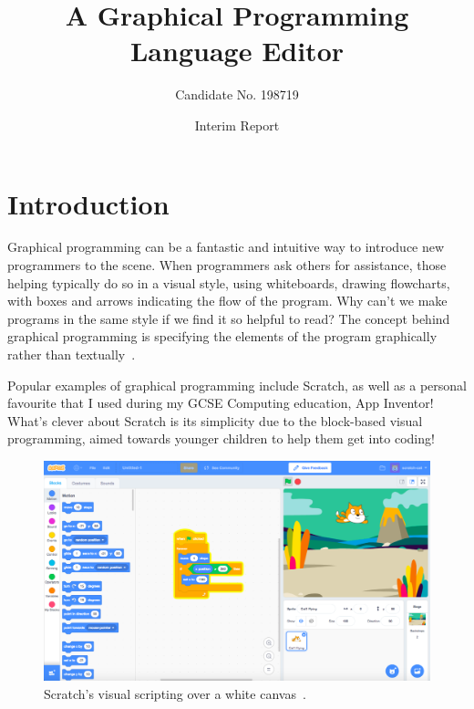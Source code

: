 \documentclass[a4paper, 12pt]{article}
\begin{document}
    \title{A Graphical Programming Language Editor}
    \author{Candidate No. 198719}
    \date{Interim Report}
    \clearpage\maketitle
    \thispagestyle{empty}

    \newpage\clearpage\thispagestyle{empty}
    \tableofcontents
    \newpage
    \setcounter{page}{1}

    \section{Introduction}
    Graphical programming can be a fantastic and intuitive way to introduce new programmers to
    the scene. When programmers ask others for assistance, those helping typically do so in a visual 
    style, using whiteboards, drawing flowcharts, with boxes and arrows indicating the flow 
    of the program. Why can't we make programs in the same style if we find it so helpful to read? 
    The concept behind graphical programming is specifying the elements of the program graphically 
    rather than textually~\cite{dehouck2015maturity}.

    Popular examples of graphical programming include Scratch, as well as a personal favourite that 
    I used during my GCSE Computing education, App Inventor!
    What's clever about Scratch is its simplicity due to the block-based visual programming, aimed 
    towards younger children to help them get into coding!

    \begin{figure}[h]
        \centering
        \includegraphics[width=160mm]{scratch_image}
        \caption{Scratch's visual scripting over a white canvas~\cite{thescratchteam}.}
    \end{figure}
\end{document}
